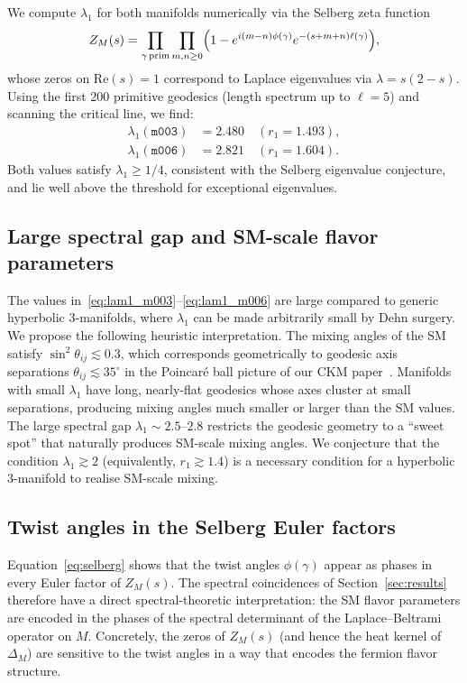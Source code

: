 \documentclass[preprint,12pt,number]{elsarticle}
\newcommand{\mfld}[1]{\texttt{#1}}
\newcommand{\degr}{^{\circ}}
\begin{document}
We compute $\lambda_1$ for both manifolds numerically via the Selberg zeta
function~\cite{Selberg56}
\begin{equation}
  Z_M(s) = \prod_{\gamma\,\rm prim}\prod_{m,n\geq 0}
  \Bigl(1-e^{i(m-n)\phi(\gamma)}e^{-(s+m+n)\ell(\gamma)}\Bigr),
  \label{eq:selberg}
\end{equation}
whose zeros on $\mathrm{Re}(s)=1$ correspond to Laplace eigenvalues via
$\lambda = s(2-s)$.
Using the first 200 primitive geodesics (length spectrum up to $\ell=5$) and
scanning the critical line, we find:
\begin{align}
  \lambda_1(\mfld{m003}) &= 2.480 \quad (r_1=1.493), \label{eq:lam1_m003}\\
  \lambda_1(\mfld{m006}) &= 2.821 \quad (r_1=1.604). \label{eq:lam1_m006}
\end{align}
Both values satisfy $\lambda_1 \geq 1/4$, consistent with the Selberg eigenvalue
conjecture, and lie well above the threshold for exceptional eigenvalues.

\subsection{Large spectral gap and SM-scale flavor parameters}

The values in~\eqref{eq:lam1_m003}--\eqref{eq:lam1_m006} are large compared
to generic hyperbolic 3-manifolds, where $\lambda_1$ can be made arbitrarily
small by Dehn surgery.
We propose the following heuristic interpretation.
The mixing angles of the SM satisfy
$\sin^2\theta_{ij}\lesssim 0.3$, which corresponds geometrically to
geodesic axis separations $\theta_{ij}\lesssim 35\degr$ in the Poincar\'e
ball picture of our CKM paper~\cite{GentryCKM}.
Manifolds with small $\lambda_1$ have long, nearly-flat geodesics whose
axes cluster at small separations, producing mixing angles much smaller or
larger than the SM values.
The large spectral gap $\lambda_1\sim 2.5$--$2.8$ restricts the geodesic
geometry to a ``sweet spot'' that naturally produces SM-scale mixing angles.
We conjecture that the condition $\lambda_1\gtrsim 2$ (equivalently,
$r_1\gtrsim 1.4$) is a necessary condition for a hyperbolic 3-manifold to
realise SM-scale mixing.

\subsection{Twist angles in the Selberg Euler factors}

Equation~\eqref{eq:selberg} shows that the twist angles $\phi(\gamma)$ appear
as phases in every Euler factor of $Z_M(s)$.
The spectral coincidences of Section~\ref{sec:results} therefore have a direct
spectral-theoretic interpretation: the SM flavor parameters are encoded in the
phases of the spectral determinant of the Laplace--Beltrami operator on $M$.
Concretely, the zeros of $Z_M(s)$ (and hence the heat kernel of $\Delta_M$)
are sensitive to the twist angles in a way that encodes the fermion flavor
structure.
\end{document}
